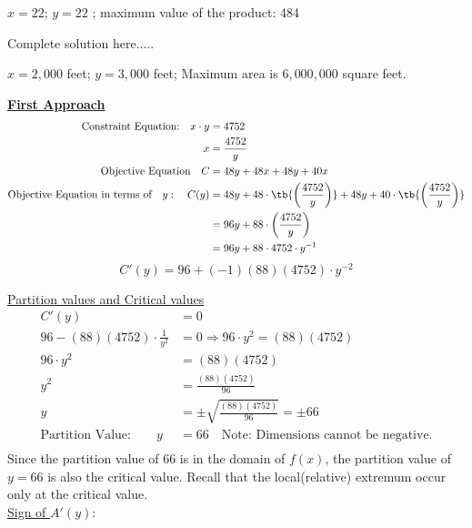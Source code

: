 \begin{example}
\begin{multicols}{2}
\end{multicols}
    \begin{sol}
    $x=22$; $y=22$ ; maximum value of the product: 484
    \end{sol}
    \begin{solL}
    Complete solution here.....
    
    \end{solL}
    
\end{example}
\newpage
\begin{example}
    
     \begin{sol}
    $x=2,000$ feet; $y=3,000$ feet; Maximum area is $6,000,000$ square feet.
    \end{sol}
     
    \begin{solL}
    	\underline{\textbf{First Approach}}
	\begin{displaymath}
		\begin{split}
			\text{Constraint Equation:}\quad x\cdot y&=4752\\
			x&=\frac{4752}{y}\\
			\text{Objective Equation}\quad C&=48y+48x+ 48y+40x\\
			\text{Objective Equation in terms of}\quad y:\quad   C(y)&=48y+48\cdot\tb{\left(\frac{4752}{y}\right)}+ 48y+40\cdot \tb{\left(\frac{4752}{y}\right)} \\
			&=96y+88\cdot\left(\frac{4752}{y}\right)\\
			&=96y+88\cdot 4752\cdot y^{-1}\\
		\end{split}
	\end{displaymath}
	$$C'(y)=96+(-1)(88)(4752)\cdot y^{-2}$$
	
	\underline{Partition values and Critical values}
	\begin{displaymath}
		\begin{split}
			C'(y) &=0 \\
			96-(88)(4752)\cdot \frac{1}{y^{2}} &=0 \Longrightarrow 96\cdot y^2 =(88)(4752) \\
			96\cdot y^2 &=(88)(4752)\\
			y^2 &=\frac{(88)(4752)}{96}\\
			y&=\pm \sqrt{\frac{(88)(4752)}{96}}=\pm 66\\
			\text{Partition Value:}\qquad  y &= 66 \quad \text{Note: Dimensions cannot be negative.} \\
		\end{split}
	\end{displaymath}
	Since the partition value of 66 is in the domain of $f(x)$,  the partition value of $y=66$ is also the critical value. Recall that the local(relative) extremum occur only at the critical value.\\
	\underline{Sign of $A'(y)$}:\\
	

\end{solL}
\end{example}
